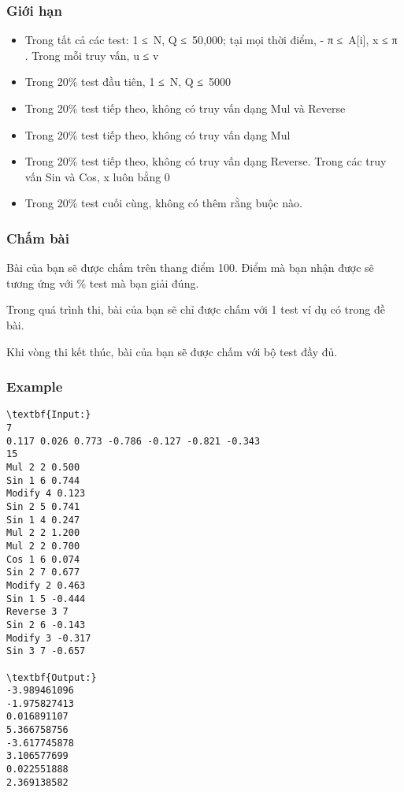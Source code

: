 \subsubsection{   Giới hạn  }
\begin{itemize}
	\item     Trong tất cả các test: 1 ≤ N, Q ≤ 50,000; tại mọi thời điểm, -         π        ≤ A[i], x ≤         π        . Trong mỗi truy vấn, u ≤ v   
	\item     Trong 20\% test đầu tiên, 1 ≤ N, Q ≤ 5000   
	\item     Trong 20\% test tiếp theo, không có truy vấn dạng Mul và Reverse   
	\item     Trong 20\% test tiếp theo, không có truy vấn dạng Mul   
	\item     Trong 20\% test tiếp theo, không có truy vấn dạng Reverse. Trong các truy vấn Sin và Cos, x luôn bằng 0   
	\item     Trong 20\% test cuối cùng, không có thêm rằng buộc nào.   
\end{itemize}

\subsubsection{   Chấm bài  }

   Bài của bạn sẽ được chấm trên thang điểm 100. Điểm mà bạn nhận được sẽ tương ứng với \% test mà bạn giải đúng.  

   Trong quá trình thi, bài của bạn sẽ chỉ được chấm với 1 test ví dụ có trong đề bài.  

   Khi vòng thi kết thúc, bài của bạn sẽ được chấm với bộ test đầy đủ.  

\subsubsection{    Example   }
\begin{verbatim}
\textbf{Input:}
7
0.117 0.026 0.773 -0.786 -0.127 -0.821 -0.343
15
Mul 2 2 0.500
Sin 1 6 0.744
Modify 4 0.123
Sin 2 5 0.741
Sin 1 4 0.247
Mul 2 2 1.200
Mul 2 2 0.700
Cos 1 6 0.074
Sin 2 7 0.677
Modify 2 0.463
Sin 1 5 -0.444
Reverse 3 7
Sin 2 6 -0.143
Modify 3 -0.317
Sin 3 7 -0.657

\textbf{Output:}
-3.989461096
-1.975827413
0.016891107
5.366758756
-3.617745878
3.106577699
0.022551888
2.369138582
\end{verbatim}
